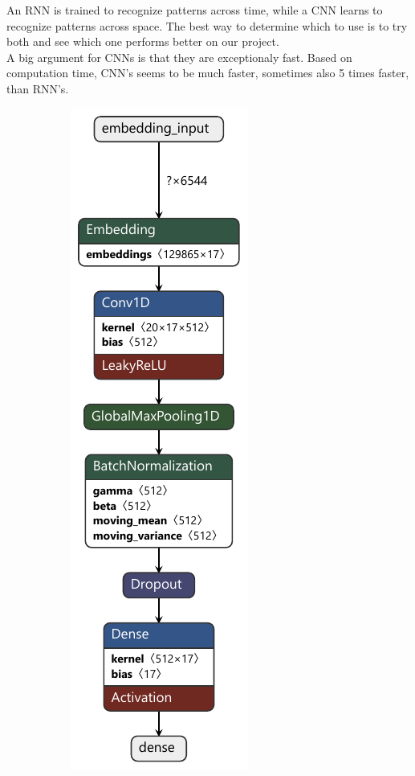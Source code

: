 An RNN is trained to recognize patterns across time, while a CNN learns to recognize patterns across space. The best way to determine which to use is to try both and see which one performs better on our project. \\
A big argument for CNNs is that they are exceptionaly fast. Based on computation time, CNN's seems to be much faster, sometimes also 5 times faster, than RNN's.

\begin{figure}[htpb]
	\centering
	\begin{subfigure}{0.47\linewidth}
		\centering
		\includegraphics[height=0.9\textheight]{Images/model_level_1.keras.pdf}

\end{subfigure}
\end{figure}
